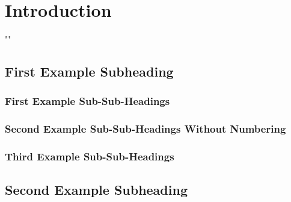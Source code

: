 \section{Introduction}

"\lipsum[1-1]"

\subsection{First Example Subheading}

\lipsum[1-4]

\subsubsection{First Example Sub-Sub-Headings}

\lipsum[1-1]

\subsubsection*{Second Example Sub-Sub-Headings Without Numbering}

\lipsum[1-1]

\subsubsection{Third Example Sub-Sub-Headings}

\lipsum[1-1]

\subsection{Second Example Subheading}

\lipsum[1-1]
